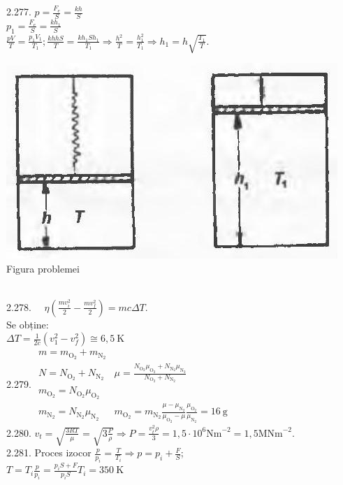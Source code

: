 2.277. $p=\frac{F_{e}}{S}=\frac{k h}{S}$\\ $p_{1}=\frac{F_{e}}{S}=\frac{k h_{1}}{S}$\\ $\frac{p V}{T}=\frac{p_{1} V_{1}}{T_{1}} ; \frac{k h h S}{T}=\frac{k h_{1} S h_{1}}{T_{1}} \Rightarrow \frac{h^{2}}{T}=\frac{h_{1}^{2}}{T_{1}} \Rightarrow h_{1}=h \sqrt{\frac{T_{1}}{T}} .$\\ \begin{center} \includegraphics[width=0.4\linewidth]{images/2025_07_01_5b3ff9fa0d508c8e9f17g-332}\\ Figura problemei \end{center}\\

2.278. $\quad \eta\left(\frac{m v_{i}^{2}}{2}-\frac{m v_{f}^{2}}{2}\right)=m c \Delta T$.\\ Se obține:\\ $\Delta T=\frac{1}{2 c}\left(v_{1}^{2}-v_{f}^{2}\right) \cong 6,5 \mathrm{~K}$\\

2.279. $\begin{array}{ll} m=m_{\mathrm{O}_{2}}+m_{\mathrm{N}_{2}}\\ N=N_{\mathrm{O}_{2}}+N_{\mathrm{N}_{2}} & \mu=\frac{N_{\mathrm{O}_{2}} \mu_{\mathrm{O}_{2}}+N_{\mathrm{N}_{2}} \mu_{\mathrm{N}_{2}}}{N_{\mathrm{O}_{2}}+N_{\mathrm{N}_{2}}} \\ m_{\mathrm{O}_{2}}=N_{\mathrm{O}_{2}} \mu_{\mathrm{O}_{2}}\\ m_{\mathrm{N}_{2}}=N_{\mathrm{N}_{2}} \mu_{\mathrm{N}_{2}} & m_{\mathrm{O}_{2}}=m_{\mathrm{N}_{2}} \frac{\mu-\mu_{\mathrm{N}_{2}}}{\mu_{\mathrm{O}_{2}}-\mu} \frac{\mu_{\mathrm{O}_{2}}}{\mu_{\mathrm{N}_{2}}}=16 \mathrm{~g} \end{array}$\\

2.280. $v_{t}=\sqrt{\frac{3 R T}{\mu}}=\sqrt{3 \frac{P}{\rho}} \Rightarrow P=\frac{v_{t}^{2} \rho}{3}=1,5 \cdot 10^{6} \mathrm{Nm}^{-2}=1,5 \mathrm{MNm}^{-2}$.\\

2.281. Proces izocor $\frac{p}{p_{i}}=\frac{T}{T_{i}} \Rightarrow p=p_{i}+\frac{F}{S}$;\\ $T=T_{i} \frac{p}{p_{i}}=\frac{p_{i} S+F}{p_{i} S} T_{i}=350 \mathrm{~K}$\\

